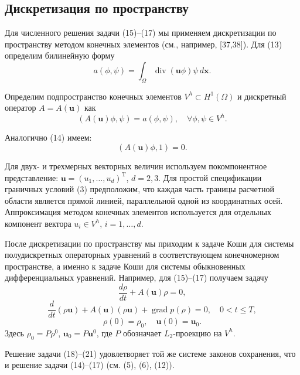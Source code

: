 \documentclass[10pt,twocolumn]{article}
\begin{document}
\subsection{Дискретизация по пространству}

Для численного решения задачи (15)--(17) мы применяем дискретизации по пространству методом конечных элементов (см., например, [37,38]). Для (13) определим билинейную форму
\[
a(\phi ,\psi) = \int_{\Omega}\operatorname{div}(\mathbf {u}\phi)\psi\,d\mathbf {x}.
\]

Определим подпространство конечных элементов \(V^{h}\subset H^{1}(\Omega)\) и дискретный оператор \(A = A(\mathbf {u})\) как
\[
(A(\mathbf {u})\phi ,\psi) = a(\phi ,\psi),\quad \forall \phi ,\psi \in V^{h}.
\]

Аналогично (14) имеем:
\begin{equation}
(A(\mathbf {u})\phi ,1) = 0. \tag{18}
\end{equation}

Для двух- и трехмерных векторных величин используем покомпонентное представление: \(\mathbf {u} = (u_{1},\ldots ,u_{d})^{\mathrm T}\), \(d = 2,3\). Для простой спецификации граничных условий (3) предположим, что каждая часть границы расчетной области является прямой линией, параллельной одной из координатных осей. Аппроксимация методом конечных элементов используется для отдельных компонент вектора \(u_{i}\in V^{h}\), \(i = 1,\ldots ,d\).

После дискретизации по пространству мы приходим к задаче Коши для системы полудискретных операторных уравнений в соответствующем конечномерном пространстве, а именно к задаче Коши для системы обыкновенных дифференциальных уравнений. Например, для (15)--(17) получаем задачу
\begin{equation}
\frac{d\rho}{dt} +A(\mathbf {u})\rho = 0, \tag{19}
\end{equation}
\begin{equation}
\frac{d}{dt} (\rho \mathbf {u}) + A(\mathbf {u})(\rho \mathbf {u}) + \operatorname{grad}p(\rho) = 0,\quad 0< t\leq T, \tag{20}
\end{equation}
\begin{equation}
\rho (0) = \rho_{0},\quad \mathbf {u}(0) = \mathbf {u}_{0}. \tag{21}
\end{equation}
Здесь \(\rho_{0} = P\rho^{0}\), \(\mathbf {u}_0 = P\mathbf {u}^0\), где \(P\) обозначает \(L_{2}\)-проекцию на \(V^{h}\).

Решение задачи (18)--(21) удовлетворяет той же системе законов сохранения, что и решение задачи (14)--(17) (см. (5), (6), (12)).
\end{document}
